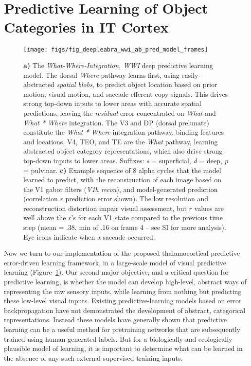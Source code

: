 \documentclass[11pt,twoside]{article}
\newif\myifpdf
\begin{document}
\section{Predictive Learning of Object Categories in IT Cortex}

\begin{figure}
  \centering\texttt{[image: figs/fig\_deepleabra\_wwi\_ab\_pred\_model\_frames]}
  \caption{{\bf a)} The \emph{What-Where-Integration, WWI} deep predictive learning model. The dorsal \emph{Where} pathway learns first, using easily-abstracted \emph{spatial blobs}, to predict object location based on prior motion, visual motion, and saccade efferent copy signals.  This drives strong top-down inputs to lower areas with accurate spatial predictions, leaving the \emph{residual} error concentrated on \emph{What} and \emph{What * Where} integration.  The V3 and DP (dorsal prelunate) constitute the \emph{What * Where} integration pathway, binding features and locations.  V4, TEO, and TE are the \emph{What} pathway, learning abstracted object category representations, which also drive strong top-down inputs to lower areas.  Suffixes: \emph{s} = superficial, \emph{d} = deep, \emph{p} = pulvinar. {\bf c)} Example sequence of 8 alpha cycles that the model learned to predict, with the reconstruction of each image based on the V1 gabor filters (\emph{V1h recon}), and model-generated prediction (correlation $r$ prediction error shown).  The low resolution and reconstruction distortion impair visual assessment, but $r$ values are well above the $r$'s for each V1 state compared to the previous time step (mean = .38, min of .16 on frame 4 -- see SI for more analysis).  Eye icons indicate when a saccade occurred.}
  \label{fig.model}
\end{figure}

Now we turn to our implementation of the proposed thalamocortical predictive error-driven learning framework, in a large-scale model of visual predictive learning (Figure~\ref{fig.model}).  Our second major objective, and a critical question for predictive learning, is whether the model can develop high-level, abstract ways of representing the raw sensory inputs, while learning from nothing but predicting these low-level visual inputs.  Existing predictive-learning models based on error backpropagation \citep{LotterKreimanCox16,JakeAddOthers} have not demonstrated the development of abstract, categorical representations.  Instead these models have generally shown that predictive learning can be a useful method for pretraining networks that are subsequently trained using human-generated labels.  But for a biologically and ecologically plausible model of learning, it is important to determine what can be learned in the absence of any such external supervised training inputs.
\end{document}
